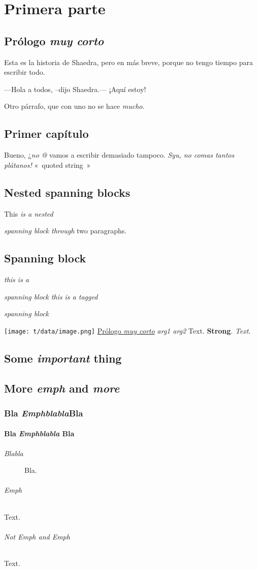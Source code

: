 \part{Primera parte}
\label{s:1}
\chapter{Prólogo \emph{muy corto}}
\label{s:2}
Esta es la historia de Shaedra, pero en más breve, porque no tengo tiempo para
escribir todo.

---Hola a todos, –dijo Shaedra.— ¡Aquí estoy!

Otro párrafo, que con uno no se hace
\textit{mucho}.

\chapter{Primer capítulo}
\label{s:3}
Bueno, ¿\emph{no}
\emph{@}
vamos a escribir demasiado tampoco.
\textit{Syu, no comas tantos plátanos!}
«~quoted string~»

\chapter{Nested spanning blocks}
\label{s:4}
This
\emph{is a
\emph{nested}}

\emph{\emph{spanning}
block through}
two paragraphs.

\chapter{Spanning block}
\label{s:5}
\emph{this is a}

\emph{spanning block}
\textit{this is a tagged}

\textit{spanning block}

\texttt{[image: t/data/image.png]}
\hyperref[s:2]{Prólogo \emph{muy corto}}
\emph{arg1 arg2}
Text.
\textbf{Strong}.
\emph{\emph{Text}}.

\chapter{Some \emph{important} thing}
\label{s:6}
\chapter{More \emph{emph} and \emph{more}}
\label{s:7}
\section{Bla \textit{Emphblabla}Bla}
\label{s:8}
\subsection{Bla \textit{Emphblabla} Bla}
\label{s:9}
\begin{description}
\item[\emph{Blabla}] Bla.
\end{description}

\paragraph{\emph{Emph}}
Text.

\paragraph{Not Emph and \emph{Emph}}
Text.

